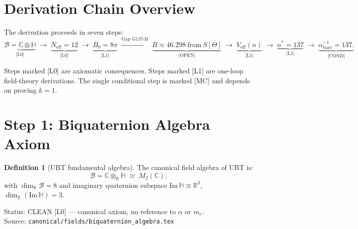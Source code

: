 \documentclass[12pt,a4paper]{article}
\theoremstyle{definition}
\newtheorem{definition}[theorem]{Definition}
\theoremstyle{remark}
\begin{document}
\section{Derivation Chain Overview}
\label{sec:ar:chain}

The derivation proceeds in seven steps:
\begin{equation}
  \underbrace{\mathcal{B}=\mathbb{C}\otimes\mathbb{H}}_{\text{[L0]}}
  \;\to\;
  \underbrace{N_{\mathrm{eff}}=12}_{\text{[L0]}}
  \;\to\;
  \underbrace{B_0=8\pi}_{\text{[L1]}}
  \;\xrightarrow{\text{Gap G137-B}}\;
  \underbrace{B\approx 46.298\ \text{from}\ S[\Theta]}_{\text{[OPEN]}}
  \;\to\;
  \underbrace{V_{\mathrm{eff}}(n)}_{\text{[L1]}}
  \;\to\;
  \underbrace{n^*=137}_{\text{[L1]}}
  \;\to\;
  \underbrace{\alpha^{-1}_{\mathrm{bare}}=137.}_{\text{[COND]}}
  \label{eq:ar:chain}
\end{equation}

Steps marked [L0] are axiomatic consequences.
Steps marked [L1] are one-loop field-theory derivations.
The single conditional step is marked [MC] and depends on proving $k = 1$.

\section{Step 1: Biquaternion Algebra Axiom}
\label{sec:ar:algebra}

\begin{definition}[UBT fundamental algebra]
\label{def:ar:algebra}
The canonical field algebra of UBT is:
\begin{equation}
  \mathcal{B} = \mathbb{C}\otimes_{\mathbb{R}}\mathbb{H}
  \;\cong\; M_2(\mathbb{C}),
  \label{eq:ar:B}
\end{equation}
with $\dim_{\mathbb{R}}\mathcal{B} = 8$ and imaginary quaternion subspace
$\mathrm{Im}\,\mathbb{H} \cong \mathbb{R}^3$, $\dim_{\mathbb{R}}(\mathrm{Im}\,\mathbb{H}) = 3$.
\end{definition}

\begin{resultbox}
Status: CLEAN [L0] — canonical axiom, no reference to $\alpha$ or $m_e$.\\
Source: \texttt{canonical/fields/biquaternion\_algebra.tex}
\end{resultbox}
\end{document}
